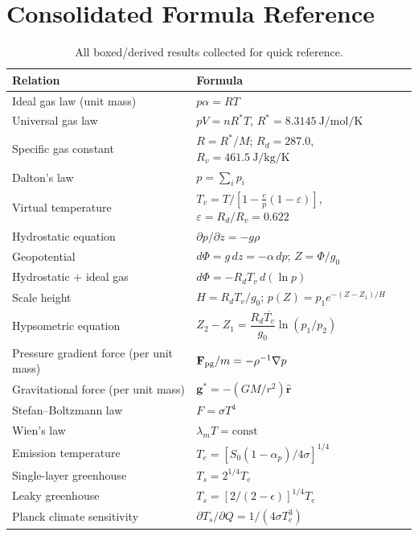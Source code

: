 \documentclass[11pt]{article}
\newcommand{\Rd}{R_d}
\newcommand{\Rv}{R_v}
\begin{document}
\section{Consolidated Formula Reference}

\begin{table}[h!]
\centering
\small
\renewcommand{\arraystretch}{1.4}
\begin{tabular}{@{}p{5.6cm}p{9.6cm}@{}}
\toprule
\textbf{Relation} & \textbf{Formula} \\
\midrule
Ideal gas law (unit mass) & $p\alpha = RT$ \\
Universal gas law & $pV=nR^*T$, $R^*=8.3145\ \si{\joule\per\mol\per\kelvin}$ \\
Specific gas constant & $R=R^*/M$; $\Rd=287.0$, $\Rv=461.5\ \si{\joule\per\kg\per\kelvin}$ \\
Dalton's law & $p=\sum_i p_i$ \\
Virtual temperature & $T_v = T\big/\left[1-\tfrac{e}{p}(1-\varepsilon)\right]$, $\varepsilon=\Rd/\Rv=0.622$ \\
Hydrostatic equation & $\partial p/\partial z = -g\rho$ \\
Geopotential & $d\Phi = g\,dz = -\alpha\,dp$; $Z=\Phi/g_0$ \\
Hydrostatic + ideal gas & $d\Phi = -\Rd T_v\,d(\ln p)$ \\
Scale height & $H=\Rd T_v/g_0$; $p(Z)=p_1 e^{-(Z-Z_1)/H}$ \\
Hypsometric equation & $Z_2-Z_1 = \dfrac{\Rd\overline{T_v}}{g_0}\ln(p_1/p_2)$ \\
Pressure gradient force (per unit mass) & $\mathbf F_{\rm pg}/m = -\rho^{-1}\nabla p$ \\
Gravitational force (per unit mass) & $\mathbf g^*=-(GM/r^2)\hat{\mathbf r}$ \\
Stefan--Boltzmann law & $F=\sigma T^4$ \\
Wien's law & $\lambda_m T = \text{const}$ \\
Emission temperature & $T_e=\left[S_0(1-\alpha_p)/4\sigma\right]^{1/4}$ \\
Single-layer greenhouse & $T_s = 2^{1/4}T_e$ \\
Leaky greenhouse & $T_s = \left[2/(2-\epsilon)\right]^{1/4}T_e$ \\
Planck climate sensitivity & $\partial T_s/\partial Q = 1/(4\sigma T_e^3)$ \\
\bottomrule
\end{tabular}
\caption{All boxed/derived results collected for quick reference.}
\end{table}
\end{document}

